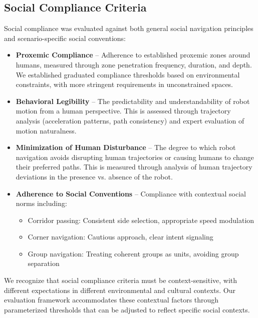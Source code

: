 \subsection{Social Compliance Criteria}
\label{subsec:social_compliance}
Social compliance was evaluated against both general social navigation principles and 
scenario-specific social conventions:
\begin{itemize}
    \item \textbf{Proxemic Compliance} -- Adherence to established proxemic zones around 
    humans, measured through zone penetration frequency, duration, and depth. We established 
    graduated compliance thresholds based on environmental constraints, with more stringent 
    requirements in unconstrained spaces.
    \item \textbf{Behavioral Legibility} -- The predictability and understandability of robot 
    motion from a human perspective. This is assessed through trajectory analysis 
    (acceleration patterns, path consistency) and expert evaluation of motion naturalness.
    \item \textbf{Minimization of Human Disturbance} -- The degree to which robot navigation 
    avoids disrupting human trajectories or causing humans to change their preferred paths. 
    This is measured through analysis of human trajectory deviations in the presence vs. 
    absence of the robot.
    \item \textbf{Adherence to Social Conventions} -- Compliance with contextual social 
    norms including:
    \begin{itemize}
        \item Corridor passing: Consistent side selection, appropriate speed modulation
        \item Corner navigation: Cautious approach, clear intent signaling
        \item Group navigation: Treating coherent groups as units, avoiding group separation
    \end{itemize}
\end{itemize}
We recognize that social compliance criteria must be context-sensitive, with different 
expectations in different environmental and cultural contexts. Our evaluation framework 
accommodates these contextual factors through parameterized thresholds that can be adjusted 
to reflect specific social contexts.


